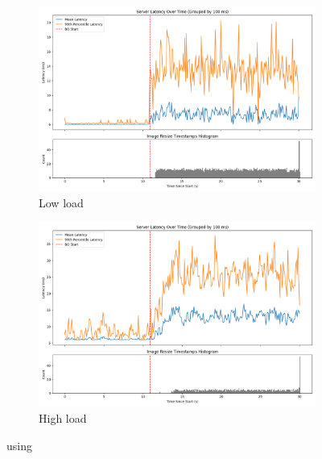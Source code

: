 \begin{figure}[t]
    \centering
    \begin{subfigure}[t]{0.49\columnwidth}
        \includegraphics[width=\columnwidth]{graphs/srv-bg-idle-low.png}
        \caption{Low load}\label{fig:srv-bg-idle-low}
    \end{subfigure}
    \hspace{\fill}
    \begin{subfigure}[t]{0.49\columnwidth}
        \includegraphics[width=\columnwidth]{graphs/srv-bg-idle-high.png}
        \caption{High load}\label{fig:srv-bg-idle-high}
    \end{subfigure}
    \vspace{4pt}
    \caption{using \schedidle{}}\label{fig:srv-bg-idle}
\end{figure}

